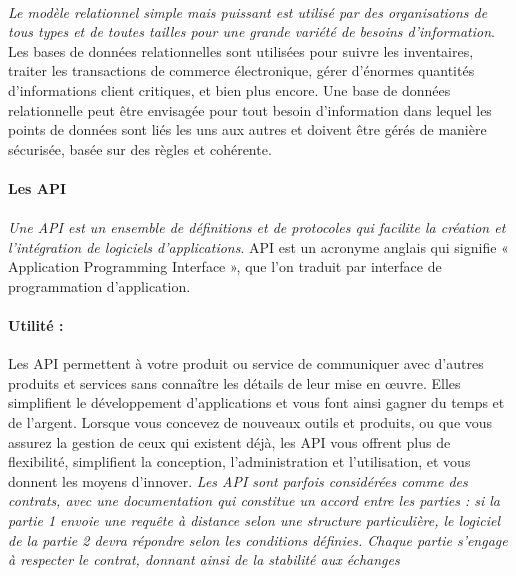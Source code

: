                  \paragraph{}
                 \textit{Le modèle relationnel simple mais puissant est utilisé par des organisations 
                 de tous types et de toutes tailles pour une grande variété de besoins d'information}\cite{Oracle}.
                  Les bases de données relationnelles sont utilisées pour suivre les inventaires, 
                  traiter les transactions de commerce électronique, gérer d'énormes quantités d'informations
                   client critiques, et bien plus encore. Une base de données relationnelle peut être envisagée 
                   pour tout besoin d'information dans lequel les points de données sont liés les uns 
                   aux autres et doivent être gérés de manière sécurisée, basée sur des règles et cohérente.

                \paragraph{Les API}
                \paragraph{}
                \textit{Une API est un ensemble de définitions et de protocoles qui facilite la création et 
                l'intégration de logiciels d'applications}\cite{RedHat}. API est un acronyme anglais qui signifie 
                « Application Programming Interface », que l'on traduit par interface de programmation d'application.
                \paragraph{Utilité :}
                Les API permettent à votre produit ou service de communiquer avec d'autres produits et services 
                sans connaître les détails de leur mise en œuvre. Elles simplifient le développement d'applications 
                et vous font ainsi gagner du temps et de l'argent. Lorsque vous concevez de nouveaux outils et produits, 
                ou que vous assurez la gestion de ceux qui existent déjà, les API vous offrent plus de flexibilité, 
                simplifient la conception, l'administration et l'utilisation, et vous donnent les moyens d'innover.
                \textit{Les API sont parfois considérées comme des contrats, avec une documentation qui constitue 
                un accord entre les parties : si la partie 1 envoie une requête à distance selon une structure 
                particulière, le logiciel de la partie 2 devra répondre selon les conditions définies. 
                Chaque partie s’engage à respecter le contrat, donnant ainsi de la stabilité aux échanges}\cite{Alteva}
